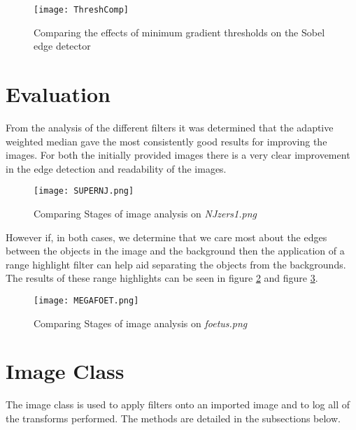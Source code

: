\documentclass{article}
\begin{document}
\begin{figure}[h]
	\centering
	\texttt{[image: ThreshComp]}
	\caption{Comparing the effects of minimum gradient thresholds on the Sobel edge detector}
	\label{fig:ThreshComp}
\end{figure}


\newpage
\section{Evaluation}

From the analysis of the different filters it was determined that the adaptive weighted median gave the most consistently good results for improving the images. For both the initially provided images there is a very clear improvement in the edge detection and readability of the images.


\begin{figure}[h!]
	\centering
	\texttt{[image: SUPERNJ.png]}
	\caption{Comparing Stages of image analysis on \textit{NJzers1.png}}
	\label{fig:SuperNJ}
\end{figure}

However if, in both cases, we determine that we care most about the edges between the objects in the image and the background then the application of a range highlight filter can help aid separating the objects from the backgrounds. The results of these range highlights can be seen in figure \ref{fig:SuperNJ} and figure \ref{fig:MegaFOET}. 

\begin{figure}[h!]
	\centering
	\texttt{[image: MEGAFOET.png]}
	\caption{Comparing Stages of image analysis on \textit{foetus.png}}
	\label{fig:MegaFOET}
\end{figure}




\section{Image Class}
The image class is used to apply filters onto an imported image and to log all of the transforms performed. The methods are detailed in the subsections below. 
\end{document}
